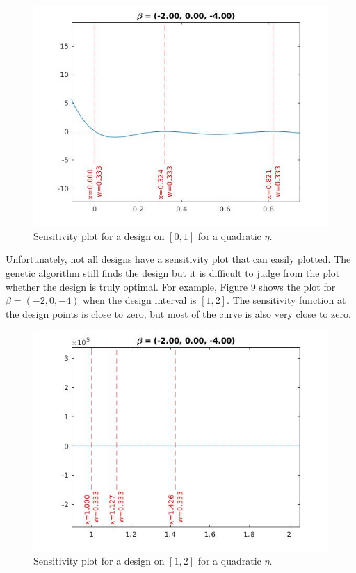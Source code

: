 \documentclass[11pt,a4paper]{article}
\begin{document}
\begin{figure}
\centering
\includegraphics[scale=0.5]{figures/3pt_2include.jpg}
\caption{Sensitivity plot for a design on $[0,1]$ for a quadratic $\eta$.}
\end{figure}

Unfortunately, not all designs have a sensitivity plot that can easily plotted. The genetic algorithm still finds the design but it is difficult to judge from the plot whether the design is truly optimal. For example, Figure 9 shows the plot for $\beta = (-2, 0, -4)$ when the design interval is $[1,2]$. The sensitivity function at the design points is close to zero, but most of the curve is also very close to zero.


\begin{figure}
\centering
\includegraphics[scale=0.5]{figures/3pt_noneend.jpg}
\caption{Sensitivity plot for a design on $[1,2]$ for a quadratic $\eta$.}
\end{figure}
\end{document}
